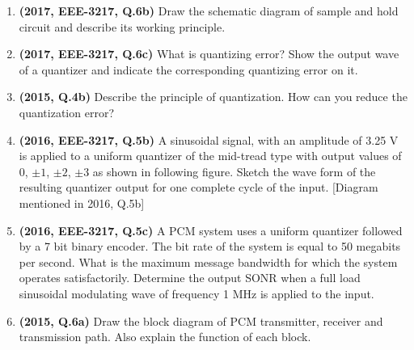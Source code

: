 \documentclass[12pt, a4paper]{article}
\begin{document}
\begin{enumerate}
		\item \textbf{(2017, EEE-3217, Q.6b)} Draw the schematic diagram of sample and hold circuit and describe its working principle.
		
		\item \textbf{(2017, EEE-3217, Q.6c)} What is quantizing error? Show the output wave of a quantizer and indicate the corresponding quantizing error on it.
		\item \textbf{(2015, Q.4b)} Describe the principle of quantization. How can you reduce the quantization error?
		
		\item \textbf{(2016, EEE-3217, Q.5b)} A sinusoidal signal, with an amplitude of 3.25 V is applied to a uniform quantizer of the mid-tread type with output values of 0, $\pm 1$, $\pm 2$, $\pm 3$ as shown in following figure. Sketch the wave form of the resulting quantizer output for one complete cycle of the input. [Diagram mentioned in 2016, Q.5b]
		
		\item \textbf{(2016, EEE-3217, Q.5c)} A PCM system uses a uniform quantizer followed by a 7 bit binary encoder. The bit rate of the system is equal to 50 megabits per second. What is the maximum message bandwidth for which the system operates satisfactorily. Determine the output SONR when a full load sinusoidal modulating wave of frequency 1 MHz is applied to the input.
		
		\item \textbf{(2015, Q.6a)} Draw the block diagram of PCM transmitter, receiver and transmission path. Also explain the function of each block.
		
	\end{enumerate}
	
\end{document}
